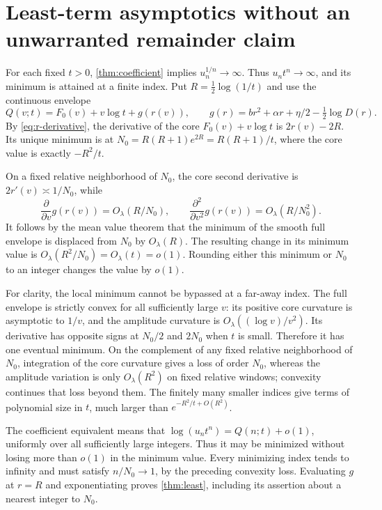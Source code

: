 \documentclass[11pt,a4paper]{article}
\theoremstyle{definition}
\numberwithin{equation}{section}
\begin{document}
\section{Least-term asymptotics without an unwarranted remainder claim}
\label{sec:least-proof}
For each fixed \(t>0\), \cref{thm:coefficient} implies
\(u_n^{1/n}\to\infty\). Thus \(u_nt^n\to\infty\), and its minimum
is attained at a finite index.
Put \(R=\tfrac12\log(1/t)\) and use the continuous envelope
\begin{equation}
 Q(v;t)=F_0(v)+v\log t+g(r(v)),\qquad
 g(r)=br^2+\alpha r+\eta/2-\tfrac12\log D(r).
 \label{eq:least-envelope}
\end{equation}
By \eqref{eq:r-derivative}, the derivative of the core
\(F_0(v)+v\log t\) is \(2r(v)-2R\). Its unique minimum is at
\(N_0=R(R+1)e^{2R}=R(R+1)/t\), where the core value is exactly
\(-R^2/t\).

On a fixed relative neighborhood of \(N_0\), the core second derivative
is \(2r'(v)\asymp1/N_0\), while
\[
 \frac{\partial}{\partial v}g(r(v))=O_\lambda(R/N_0),\qquad
 \frac{\partial^2}{\partial v^2}g(r(v))=O_\lambda(R/N_0^2).
\]
It follows by the mean value theorem that the minimum of the smooth
full envelope is displaced from \(N_0\) by \(O_\lambda(R)\).
The resulting change in its minimum value is
\(O_\lambda(R^2/N_0)=O_\lambda(t)=o(1)\).
Rounding either this minimum or \(N_0\) to an integer changes the value
by \(o(1)\).

For clarity, the local minimum cannot be bypassed at a far-away index.
The full envelope is strictly convex for all sufficiently large \(v\):
its positive core curvature is asymptotic to \(1/v\), and the amplitude
curvature is \(O_\lambda((\log v)/v^2)\). Its derivative has opposite
signs at \(N_0/2\) and \(2N_0\) when \(t\) is small. Therefore it has
one eventual minimum. On the complement of any fixed relative
neighborhood of \(N_0\), integration of the core curvature gives a
loss of order \(N_0\), whereas the amplitude variation is only
\(O_\lambda(R^2)\) on fixed relative windows; convexity continues that
loss beyond them. The finitely many smaller indices give terms of
polynomial size in \(t\), much larger than \(e^{-R^2/t+O(R^2)}\).

The coefficient equivalent means that
\(\log(u_nt^n)=Q(n;t)+o(1)\), uniformly over all sufficiently large
integers. Thus it may be minimized without losing more than \(o(1)\)
in the minimum value. Every minimizing index tends to infinity and must
satisfy \(n/N_0\to1\), by the preceding convexity loss.
Evaluating \(g\) at \(r=R\) and exponentiating proves
\cref{thm:least}, including its assertion about a nearest integer to
\(N_0\).
\end{document}
